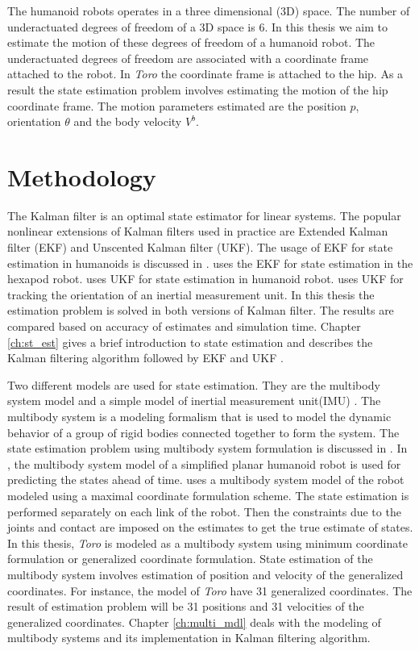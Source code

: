    The humanoid robots operates in a three dimensional (3D) space. The number of underactuated degrees of freedom of a 3D space is 6. 
   In this thesis we aim to estimate the motion of these degrees of freedom of a humanoid robot. The underactuated degrees of freedom are associated with a coordinate frame attached to the robot. In \emph{Toro} the coordinate frame is attached to the hip. As a result the state estimation problem involves estimating the motion of the hip coordinate frame. The motion parameters estimated are the position $p$, orientation $\theta$ and the body velocity $V^b$.

 \section{Methodology} 
The Kalman filter is an optimal state estimator for linear systems. The popular nonlinear extensions of Kalman filters used in practice are Extended Kalman filter (EKF) and Unscented Kalman filter (UKF). The usage of EKF for state estimation in humanoids is discussed in \citep{atk12}. \citep{bloe12} uses the EKF for state estimation in the hexapod robot. \citep{oli12} uses UKF for state estimation in humanoid robot. \citep{edg03} uses UKF for tracking the orientation of an inertial measurement unit. In this thesis the estimation problem is solved in both versions of Kalman filter. The results are compared based on accuracy of estimates and simulation time. Chapter \ref{ch:st_est} gives a brief introduction to state estimation and describes the Kalman filtering algorithm followed by EKF and UKF .

    Two different models are used for state estimation. They are the multibody system model and a simple model of  inertial measurement unit(IMU) \citep{bloe12}. The multibody system is a modeling formalism that is used to model the dynamic behavior of a group of rigid bodies connected together to form the system. The state estimation problem using multibody system formulation is discussed in \citep{atk12}. In \citep{atk12}, the multibody system model of a simplified planar humanoid robot is used for predicting the states ahead of time. \citep{oli12} uses a multibody system model of the robot modeled using a maximal coordinate formulation scheme. The state estimation is performed separately on each link of the robot. Then the constraints due to the joints and contact are imposed on the estimates to get the true estimate of states. In this thesis, \emph{Toro} is modeled as a multibody system using minimum coordinate formulation or generalized coordinate formulation. State estimation of the multibody system involves estimation of position and velocity of the generalized coordinates. For instance, the model of \emph{Toro} have 31 generalized coordinates. The result of estimation problem will be 31 positions and 31 velocities of the generalized coordinates. Chapter \ref{ch:multi_mdl} deals with the modeling of multibody systems and its implementation in Kalman filtering algorithm. 
    
